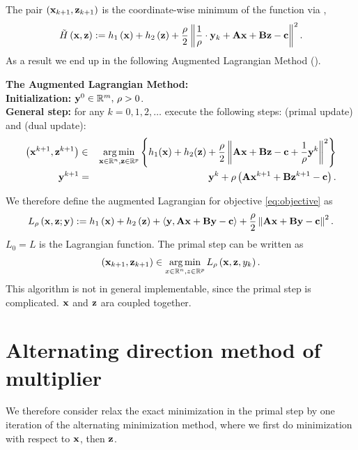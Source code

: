 \documentclass{article}
\begin{document}
The pair $\left(\mathbf{x}_{k+1}, \mathbf{z}_{k+1}\right)$ is the coordinate-wise minimum of the function via \cite[Lemma 14.7]{beck2017first}, 
\begin{align*}
    \tilde{H}\left(\mathbf{x}, \mathbf{z}\right) := h_1\left(\mathbf{x}\right) + h_2\left(\mathbf{z}\right) + \frac{\rho}{2}\left\| \frac{1}{\rho}\cdot\mathbf{y}_k + \mathbf{A}\mathbf{x} + \mathbf{B}\mathbf{z} - \mathbf{c} \right\|^2.
\end{align*}
As a result we end up in the following Augmented Lagrangian Method ().
\vspace{0.3cm}
\begin{tcolorbox}[colback=gray!10, colframe=black, boxrule=0.5pt, width=\textwidth]
    \textbf{The Augmented Lagrangian Method:}
    \\
    
    \textbf{Initialization:} $\mathbf{\mathbf{y}}^0 \in \mathbb{R}^m, \, \rho > 0$.\\
    \textbf{General step:} for any $k = 0, 1, 2, \ldots$ execute the following steps: (primal update) and (dual update):
    \begin{eqnarray*}
        \left(\mathbf{x}^{k+1}, \mathbf{z}^{k+1}\right) &\in& \operatorname*{arg\,min}_{\mathbf{x} \in \mathbb{R}^n, \mathbf{z} \in \mathbb{R}^p} \left\{ h_1(\mathbf{x}) + h_2(\mathbf{z}) + \frac{\rho}{2} \left\lVert \mathbf{A} \mathbf{x} + \mathbf{B} \mathbf{z} - \mathbf{c} + \frac{1}{\rho} \mathbf{y}^k \right\rVert^2
        \right\} \\ 
        \mathbf{y}^{k+1} &=& \mathbf{y}^k + \rho \left(\mathbf{A} \mathbf{\mathbf{x}}^{k+1} + \mathbf{B} \mathbf{\mathbf{z}}^{k+1} - \mathbf{\mathbf{c}}\right).
    \end{eqnarray*}
\end{tcolorbox}
We therefore define the augmented Lagrangian for objective \ref{eq:objective} as 
\begin{align*}
    L_\rho\left(\mathbf{x}, \mathbf{z}; \mathbf{y}\right) := h_1\left(\mathbf{x}\right) + h_2\left(\mathbf{z}\right) + \left\langle \mathbf{y}, \mathbf{A}\mathbf{x} + \mathbf{B}\mathbf{y} - \mathbf{c} \right\rangle + \frac{\rho}{2}\left\| \mathbf{A}\mathbf{x} + \mathbf{B}\mathbf{y} - \mathbf{c} \right\|^2.
\end{align*}
$L_0 = L$ is the Lagrangian function. 
The primal step can be written as 
\begin{align*}
    \left(\mathbf{x}_{k+1}, \mathbf{z}_{k+1}\right) \in \operatorname*{arg\,min}_{x \in \mathbb{R}^n, z\in \mathbb{R}^p} L_\rho\left(\mathbf{x}, \mathbf{z}, y_k\right).
\end{align*}
This algorithm is not in general implementable, since the primal step is complicated.
$\mathbf{x}$ and $\mathbf{z}$ ara coupled together.


\section{Alternating direction method of multiplier}
We therefore consider relax the exact minimization in the primal step by one iteration of the alternating minimization method, where we first do minimization with respect to $\mathbf{x}$, then $\mathbf{z}$.



\end{document}
